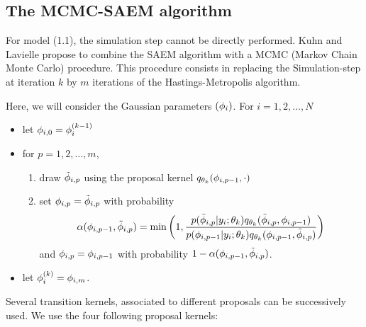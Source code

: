 \subsection{The MCMC-SAEM algorithm}
For model (1.1), the simulation step cannot be directly performed. Kuhn and Lavielle \cite{kuhn01}
propose to combine the SAEM algorithm with a MCMC (Markov Chain Monte Carlo) procedure. This procedure
consists in replacing the Simulation-step at iteration $k$ by $m$ iterations of the
Hastings-Metropolis algorithm.

Here, we will consider the Gaussian parameters $({{\phi}_i})$. For $i=1,2,\ldots,N$
\begin{itemize}
\item let ${\phi}_{i,0}={\phi}_{i}^{(k-1)}$
\item for $p=1,2,\ldots,m$,
\begin{enumerate}
\item draw $ \tilde{{\phi}}_{i,p}$ using the proposal kernel
$ q_{\theta_k}( {\phi}_{i,p-1} ,\cdot) $
\item set $ {\phi}_{i,p} =  \tilde{{\phi}}_{i,p} $ with probability
$$ \alpha( {\phi}_{i,p-1} ,  \tilde{{\phi}}_{i,p} ) = \min \left(1, \frac
{ p( \tilde{{\phi}}_{i,p} |y_i;\theta_k) q_{\theta_k}(\tilde{{\phi}}_{i,p} , {\phi}_{i,p-1} )}
{ p( {\phi}_{i,p-1} |y_i;\theta_k) q_{\theta_k}({\phi}_{i,p-1} ,\tilde{{\phi}}_{i,p} )} \right)$$ and
${\phi}_{i,p} =  {\phi}_{i,p-1}$ with probability $1- \alpha( {\phi}_{i,p-1} ,  \tilde{{\phi}}_{i,p} ) $.
\end{enumerate}
\item let ${\phi}_i^{(k)} =  {\phi}_{i,m}$.
 \end{itemize}

Several transition kernels, associated to different proposals can be successively used.
We use the four following proposal kernels:

